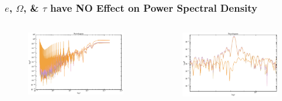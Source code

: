 \documentclass[hyperref={pdfpagelabels=false}]{beamer}
\begin{document}
\begin{frame}
\frametitle{$e$, $\Omega$, \& $\tau$ have NO Effect on Power Spectral Density}
  \begin{columns}
  \centering
    \begin{column}{0.5\textwidth}
      \begin{figure}
        \includegraphics[scale=0.04]{images/Ps_full.jpg}
      \end{figure}
    \end{column}
    \begin{column}{0.5\textwidth}
        \begin{figure}
          \includegraphics[scale=0.12]{images/Ps_detail.jpg}
        \end{figure}
    \end{column}
  \end{columns}
  \begin{columns}

\end{columns}
\end{frame}
\end{document}
